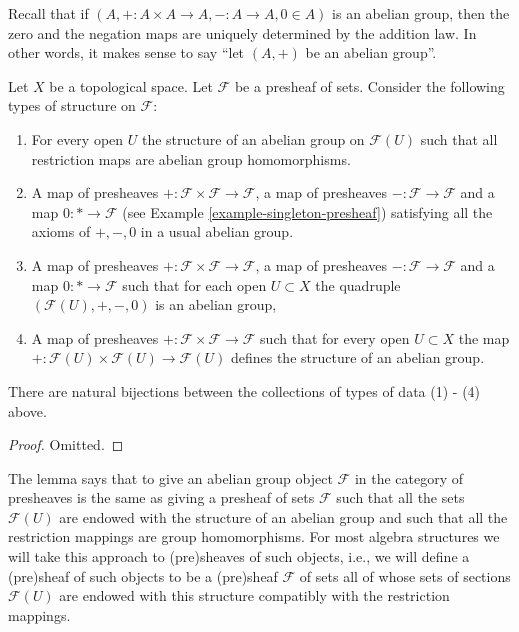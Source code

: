 \noindent
Recall that if $(A, + : A\times A \to A, - : A \to A, 0\in A)$
is an abelian group, then the zero and the negation maps are
uniquely determined by the addition law. In other words, it
makes sense to say ``let $(A, +)$ be an abelian group''.

\begin{lemma}
\label{lemma-abelian-presheaves}
Let $X$ be a topological space.
Let $\mathcal{F}$ be a presheaf of sets.
Consider the following types of structure on $\mathcal{F}$:
\begin{enumerate}
\item For every open $U$ the structure of an abelian group
on $\mathcal{F}(U)$ such that all restriction maps are
abelian group homomorphisms.
\item A map of presheaves
$+ : \mathcal{F} \times \mathcal{F} \to \mathcal{F}$,
a map of presheaves $- : \mathcal{F} \to \mathcal{F}$
and a map $0 : * \to \mathcal{F}$
(see Example \ref{example-singleton-presheaf})
satisfying all the axioms of $+, -, 0$ in a usual
abelian group.
\item A map of presheaves
$+ : \mathcal{F} \times \mathcal{F} \to \mathcal{F}$,
a map of presheaves $- : \mathcal{F} \to \mathcal{F}$
and a map $0 : * \to \mathcal{F}$
such that for each open $U \subset X$ the quadruple
$(\mathcal{F}(U), +, -, 0)$ is an abelian group,
\item A map of presheaves $+ : \mathcal{F} \times \mathcal{F}
\to \mathcal{F}$ such that for every open $U \subset X$
the map $+ : \mathcal{F}(U) \times \mathcal{F}(U) \to \mathcal{F}(U)$
defines the structure of an abelian group.
\end{enumerate}
There are natural bijections between the collections of
types of data (1) - (4) above.
\end{lemma}

\begin{proof}
Omitted.
\end{proof}

\noindent
The lemma says that to give an abelian group object $\mathcal{F}$
in the category of presheaves is the same as giving a presheaf of sets
$\mathcal{F}$ such that all the sets $\mathcal{F}(U)$ are endowed
with the structure of an abelian group and such that all the restriction
mappings are group homomorphisms. For most algebra structures
we will take this approach to (pre)sheaves of such objects, i.e.,
we will define a (pre)sheaf of such objects to be a (pre)sheaf
$\mathcal{F}$ of sets all of whose sets of sections $\mathcal{F}(U)$
are endowed with this structure compatibly with the restriction
mappings.

